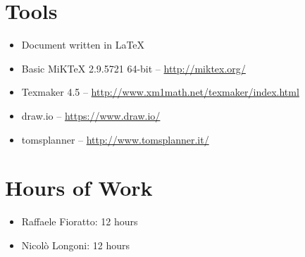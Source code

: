 \newpage
\begin{appendices}
\section{Tools}
\begin{itemize}
	\item Document written in \LaTeX
	\item Basic MiKTeX 2.9.5721 64-bit -- \url{http://miktex.org/}
	\item Texmaker 4.5 -- \url{http://www.xm1math.net/texmaker/index.html}
	\item draw.io -- \url{https://www.draw.io/}
	\item tomsplanner -- \url{http://www.tomsplanner.it/}
\end{itemize}
\break
\section{Hours of Work}
\begin{itemize}
	\item Raffaele Fioratto: 12 hours
	\item Nicol\`{o} Longoni: 12 hours 
\end{itemize}
\end{appendices}